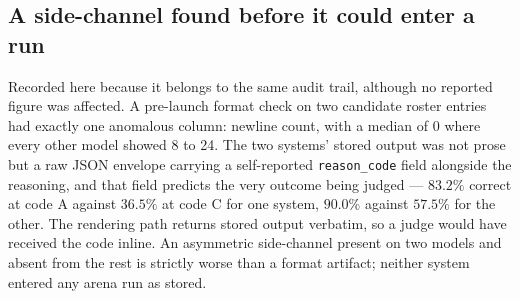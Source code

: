 \subsection*{A side-channel found before it could enter a run}

Recorded here because it belongs to the same audit trail, although no
reported figure was affected. A pre-launch format check on two
candidate roster entries had exactly one anomalous column: newline
count, with a median of $0$ where every other model showed 8 to 24.
The two systems' stored output was not prose but a raw JSON envelope
carrying a self-reported \texttt{reason\_code} field alongside the
reasoning, and that field predicts the very outcome being judged ---
$83.2\%$ correct at code A against $36.5\%$ at code C for one system,
$90.0\%$ against $57.5\%$ for the other. The rendering path returns
stored output verbatim, so a judge would have received the code
inline. An asymmetric side-channel present on two models and absent
from the rest is strictly worse than a format artifact; neither system
entered any arena run as stored.

